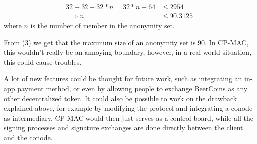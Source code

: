 \begin{align}
	\label{eq:max_qr_pk}
	32 + 32 + 32*n = 32 * n + 64 &\leq 2954 \\
	\implies n &\leq 90.3125
\end{align}
where $n$ is the number of member in the anonymity set. 

From (3) we get that the maximum size of an anonymity set is 90. In CP-MAC, this wouldn't really be an annoying boundary, however, in a real-world situation, this could cause troubles.

A lot of new features could be thought for future work, such as integrating an in-app payment method, or even by allowing people to exchange BeerCoins as any other decentralized token. It could also be possible to work on the drawback explained above, for example by modifying the protocol and integrating a conode as intermediary. CP-MAC would then just serves as a control board, while all the signing processes and signature exchanges are done directly between the client and the conode.